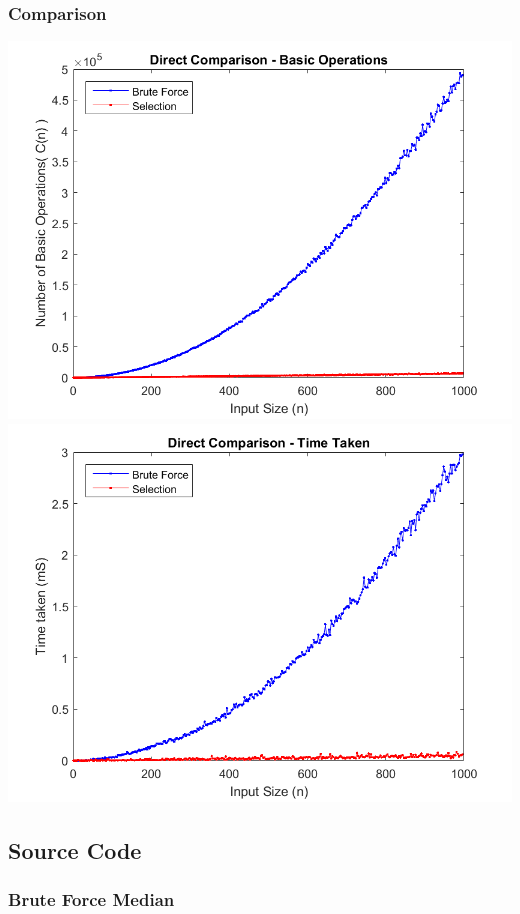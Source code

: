 \documentclass{article}
\begin{document}
        \subsubsection{Comparison}
            \includegraphics[scale=0.6]{Images/direct_comparison_basic_operations.png}\\
            \includegraphics[scale=0.6]{Images/direct_comparison_time_taken.png}

    \subsection{Source Code}
        \subsubsection{Brute Force Median}
            
\end{document}

